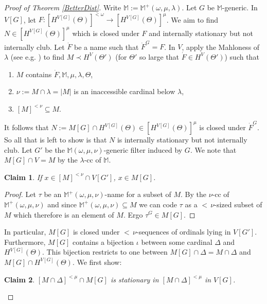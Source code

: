 \documentclass[12pt]{amsart}
\theoremstyle{definition}
\theoremstyle{remark}
\theoremstyle{plain}
\newtheorem{myclaim}{Claim}
\numberwithin{mydef}{section}
\newcommand{\dM}{\mathbb{M}}
\begin{document}
	\begin{proof}[Proof of Theorem \ref{BetterDist}]
		Write $\dM:=\dM^+(\omega,\mu,\lambda)$. Let $G$ be $\dM$-generic. In $V[G]$, let $F\colon[H^{V[G]}(\Theta)]^{<\omega}\to[H^{V[G]}(\Theta)]^{\mu}$. We aim to find $N\in[H^{V[G]}(\Theta)]^{\mu}$ which is closed under $F$ and internally stationary but not internally club. Let $\dot{F}$ be a name such that $\dot{F}^G=F$. In $V$, apply the Mahloness of $\lambda$ (see e.g. \cite{HarringtonShelahExactEquiconsistencies}) to find $M\prec H^V(\Theta')$ (for $\Theta'$ so large that $\dot{F}\in H^V(\Theta')$) such that
		\begin{enumerate}
			\item $M$ contains $\dot{F},\dM,\mu,\lambda,\Theta$,
			\item $\nu:=M\cap\lambda=|M|$ is an inaccessible cardinal below $\lambda$,
			\item $[M]^{<\nu}\subseteq M$.
		\end{enumerate}
		
		It follows that $N:=M[G]\cap H^{V[G]}(\Theta)\in[H^{V[G]}(\Theta)]^{\mu}$ is closed under $\dot{F}^G$. So all that is left to show is that $N$ is internally stationary but not internally club. Let $G'$ be the $\dM(\omega,\mu,\nu)$-generic filter induced by $G$. We note that $M[G]\cap V=M$ by the $\lambda$-cc of $\dM$.
		\setcounter{myclaim}{0}
		\begin{myclaim}\label{Claim1}
			If $x\in[M]^{<\nu}\cap V[G']$, $x\in M[G]$.
		\end{myclaim}
		
		\begin{proof}
			Let $\tau$ be an $\dM^+(\omega,\mu,\nu)$-name for a subset of $M$. By the $\nu$-cc of $\dM^+(\omega,\mu,\nu)$ and since $\dM^+(\omega,\mu,\nu)\subseteq M$ we can code $\tau$ as a ${<}\,\nu$-sized subset of $M$ which therefore is an element of $M$. Ergo $\tau^G\in M[G]$.
		\end{proof}
		
		In particular, $M[G]$ is closed under ${<}\,\nu$-sequences of ordinals lying in $V[G']$. Furthermore, $M[G]$ contains a bijection $\iota$ between some cardinal $\Delta$ and $H^{V[G]}(\Theta)$. This bijection restricts to one between $M[G]\cap\Delta=M\cap\Delta$ and $M[G]\cap H^{V[G]}(\Theta)$. We first show:
		
		\begin{myclaim}\label{Claim2}
			$[M\cap\Delta]^{<\mu}\cap M[G]$ is stationary in $[M\cap\Delta]^{<\mu}$ in $V[G]$.
		\end{myclaim}
		

\end{proof}
\end{document}
